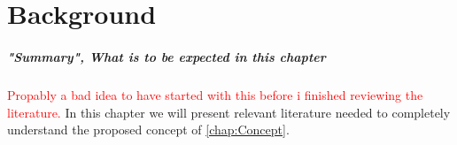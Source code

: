 \documentclass[main.tex]{subfiles}
\begin{document}
\chapter{Background}
\paragraph*{"Summary", What is to be expected in this chapter}
\textcolor{red}{Propably a bad idea to have started with this before i finished reviewing the literature.}
In this chapter we will present relevant literature needed to completely understand the proposed concept of \autoref{chap:Concept}.






\end{document}

